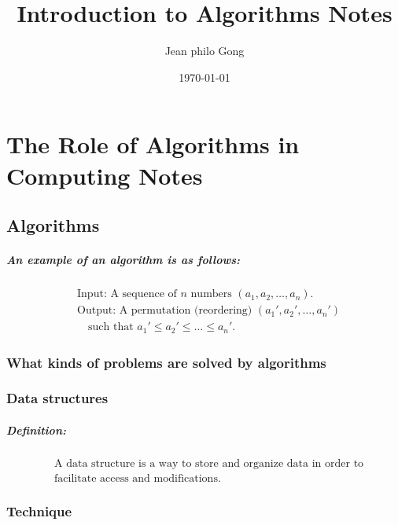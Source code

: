 \documentclass{book}
\title{Introduction to Algorithms Notes}
\author{Jean philo Gong}
\date{\today}  %
\begin{document}
\maketitle

\tableofcontents  %

\chapter{The Role of Algorithms in Computing Notes}

\section{Algorithms}

\paragraph{An example of an algorithm is as follows:}
\begin{align*}
    &\text{Input: A sequence of } n \text{ numbers } (a_1, a_2, \ldots, a_n). \\
    &\text{Output: A permutation (reordering) } (a_1', a_2', \ldots, a_n') \\
    &\quad \text{such that } a_1' \leq a_2' \leq \ldots \leq a_n'.
\end{align*}

\subsection{What kinds of problems are solved by algorithms}

\subsection{Data structures}

\paragraph{Definition:}
\begin{align*}
    &\text{A data structure is a way to store and organize data in order to} \\
    &\text{facilitate access and modifications.}
\end{align*}

\subsection{Technique}
\end{document}
